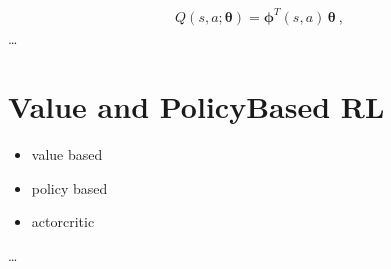 \documentclass[letterpaper,10pt,english]{jupyterBook}
\begin{document}
\sphinxAtStartPar
{}
\begin{equation*}
\begin{split}Q(s, a; \boldsymbol{\theta}) = \boldsymbol{\phi}^T(s,a) \, \boldsymbol{\theta} \ ,\end{split}
\end{equation*}
\sphinxAtStartPar
…


\section{Value and Policy\sphinxhyphen{}Based RL}
\label{\detokenize{ch/rl/mdp_large_continuous:value-and-policy-based-rl}}\begin{itemize}
\item {} 
\sphinxAtStartPar
value based

\item {} 
\sphinxAtStartPar
policy based

\item {} 
\sphinxAtStartPar
actor\sphinxhyphen{}critic

\end{itemize}

\sphinxAtStartPar
…
\end{document}
